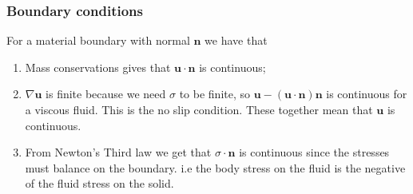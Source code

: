 \documentclass{article}
\begin{document}
\subsubsection{Boundary conditions}
 For a material boundary with normal $ \mathbf n $ we have that
 \begin{enumerate}
	 \item Mass conservations gives that $ \mathbf u \cdot \mathbf n $ is continuous;
	 \item $ \nabla \mathbf u $ is finite because we need $ \sigma $ to be finite, so $ \mathbf u - (\mathbf u \cdot\mathbf n)\mathbf n $ is continuous for a  viscous fluid. This is the no slip condition. These together mean that $ \mathbf u $ is continuous.
	 \item From Newton's Third law we get that $ \sigma \cdot \mathbf n $ is continuous since the stresses must balance on the boundary. i.e the body stress on the fluid is the negative of the fluid stress on the solid.
 \end{enumerate}
\end{document}
